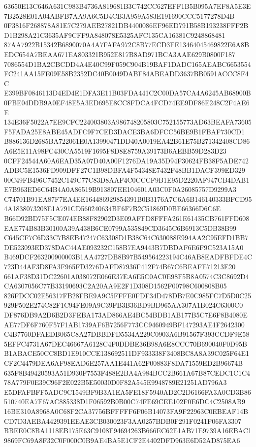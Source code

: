 \documentclass[UTF8,fontset=fandol,zihao=-4,a4paper]{ctexart}
\begin{document}
{{63650E13C646A631C983B4736A819681B3C742CC627EFF1B5B095A7EF8A5E3E7B2528E01A04ABFB7AA9A6C5D4CB3A959A583E191690CCC5177278D4B
0F3816F268878A81E7C279AEB27821DB4400086EF96ED791B58B193238FFF2BD1B298A21C3635AF9CFF9A848078E5325AFC135CA16381C9248868481
87AA7922B15342B6890070A4A7FAFA972C8B77ECD3FE13464045469822E6A8BEDC654A7BEAA671EA803321B952E817B8AD971BCA3AAE629B0800F187
7086554D1BA2CBCDD4A4E40C99F059C904B19BAF1DADC165AEABC6653554FC241AA15FE09E58B2352DC40B0049DABF84ABEADD3637BB0591ACCC8F4C
E399BF0846113D4ED4E1DFA3E11B03FDA441C2C00DA57CA4A6245AB68900B0FBE04DDB9A0EF48E5A3ED695E8CC8FDCA4FCD74EE9DF86E248C2F4AE6E
134E36F5022A7EE9CFC224003803A986748205803C752155773AD63BEAFA73605F5FADA25E8ABE45ADFC9F7CED3DACE3BA6DFCC56BE9B1FBAF730CD1
B886136D2685BA722061E0A13990471DD40A0019EA42B61E75B271342408CD86A6E5E11A98FC430CA5519F1695F8D8E8759A39173B6AEBB59D283D23
0CFF24544A60A6EAD35A07D40A00F1276DA19A35D94F30624FB38F5ADE742ADBC5E1536FD909DFF27C1B98DBFA4F54348E7432F48BB1DACF399ED329
00C49FB496C7452C149C77C83D8AAF4C0CCCF9B1E95D2220AF947CB4DAB1E7B963ED6C64B4A0A86519B913807EE104601A03C0F0A26085757D9299A3
C74701B91EA87F7EA4EE164486929854391B0B3176A7C6A6B146140333BFCD954A1838073208E1A791CD560240634BF6F7B2C51869D0BE66366D6C6E
B66D92BD75F5CE074EB88F82902D3E09AFFD8FFFA261E61435CB761FFD608EAE774B83B30100A39A438B6CE0799A535849CD3645C6B6913C5DB38B99
C645CF7C6D33C7B8EB47247C63308D1B38C64C630088E994AA2C95EFD1BB7DE523093ED378DAC44AE093232C158B7EA9443B7DBDAF6E6F9C523A15A0
B469DCF263200900003B1AA4727DB8B97B549564223194C46AB8EADFBFDE4C723D44AF3D8FA3F965FD3276DAFD87936F412F74B67C6BEAFE71213E20
661AF38D31DC22601A038072E066E37EA6E5C0AC0E98F5B8A0574C3C8692D4CA6307056C77B33190693C2A20AA9E2F1D308D1562F00798C600808B05
826FDCC02E56317FB28FBE9A9C5FFFE0FDF34D478DB7E0C985FC7D5D0C25929F502E274C82F1C94FE09A9C39FB3B36BD9BD965AA307A1B024C6300C0
DF876DB9A2D6B2D3FEBA173AD866AE4BC54BDB1AB177B5C7E6F8B4080EAE77DF6F760F57F1AB1739AF6B7256F773CC9460949BF147293AE1F2642300
C4B7760DFAEDB065C8A27DBBDFD5534A229C0903A6B91567F393CCDF9E585EFFC4731A67DEC46667A6128C4F0DDBE36B98A6E8CCC70B690040F0D95B
B1ABACE50CC8BD1E910CCE138692511DF933338F3408BC8A8A39C025F64E1CF2C4479DEA6AF98EAD6E257AA1E441A62F00883F8DA71559ED2B96674B
635F8B49420593A51D930F7553F488E2BA4A984BCC2B661A67B87CEDC1C1C478A779F0E39C96F2E022B5E50030D0F82A545E9948789E21251AD796A3
E5DFAFBFF5ADC9C1549BF9B3A1EA5FE18F5940AD2C2D6166FA3A0CD3B86510740EA7F67AC885338D1F06592B0B00C74FE69CEE102F0E6DC4C2508AB9
16BE310A8968A0C68F2CA37756BFFFFF6F06B14073FA9F22963C0EBEAF14BCD7D3AEBA4429391EEAE3CB030023F3AA0257BDB0F291F0241F06FA3307
BBEE0C8BA1118EB175E63C9108F94694263B666EC62E1AB71E9739A16EBAC19869FC69A8F32C0F000C0B9AE4BA5E1CF2E4402DFD963E6D52AD875EA6
}}
\end{document}
